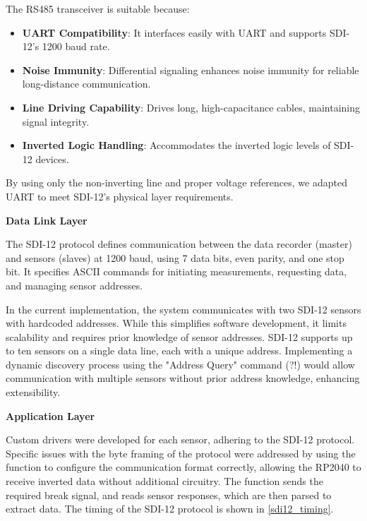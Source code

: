 The RS485 transceiver is suitable because:

\begin{itemize} 
    \item \textbf{UART Compatibility}: It interfaces easily with UART and supports SDI-12's 1200 baud rate. 
    \item \textbf{Noise Immunity}: Differential signaling enhances noise immunity for reliable long-distance communication. 
    \item \textbf{Line Driving Capability}: Drives long, high-capacitance cables, maintaining signal integrity. 
    \item \textbf{Inverted Logic Handling}: Accommodates the inverted logic levels of SDI-12 devices. 
\end{itemize}

By using only the non-inverting line and proper voltage references, we adapted UART to meet SDI-12's physical layer requirements.

\textbf{Data Link Layer}

The SDI-12 protocol defines communication between the data recorder (master) and sensors (slaves) at 1200 baud, using 7 data bits, even parity, and one stop bit. It specifies ASCII commands for initiating measurements, requesting data, and managing sensor addresses.

In the current implementation, the system communicates with two SDI-12 sensors with hardcoded addresses. While this simplifies software development, it limits scalability and requires prior knowledge of sensor addresses. SDI-12 supports up to ten sensors on a single data line, each with a unique address. Implementing a dynamic discovery process using the "Address Query" command (?!) would allow communication with multiple sensors without prior address knowledge, enhancing extensibility.

\textbf{Application Layer}

Custom drivers were developed for each sensor, adhering to the SDI-12 protocol. Specific issues with the byte framing of the protocol were addressed by using the 
 function to configure the communication format correctly, allowing the RP2040 
to receive inverted data without additional circuitry. 
The  function sends the required break signal, and  reads sensor responses, which are then parsed to extract data. The timing of the SDI-12 protocol is shown 
in \cref{sdi12_timing}.

